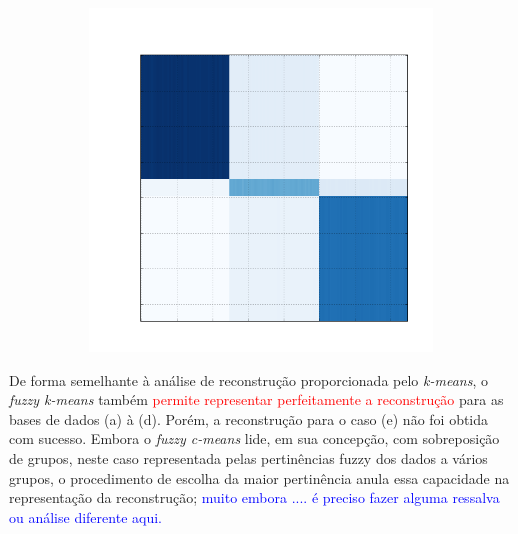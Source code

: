 \documentclass[
    12pt,                %
    oneside,            %
    a4paper,            %
    english,            %
    brazil                %
    ]{abntex2ppgsi}
\begin{document}
\begin{figure}[H]
\begin{subfigure}[b]{0.18\textwidth}
        \caption{}
    \end{subfigure}
    \begin{subfigure}[b]{0.18\textwidth}
        \includegraphics[width=\textwidth]{img/e-reconstruction-fkmeans.png}
        \caption{}
    \end{subfigure}
    \label{fig:reconstruction:fkmeans}
        \label{fig:reconstruction:kmeans}
\end{figure}



De forma semelhante à análise de reconstrução proporcionada pelo \textit{k-means}, o \textit{fuzzy k-means} também  \textcolor{red}{permite representar perfeitamente a reconstrução} para as bases de dados (a) à (d). Porém, a reconstrução para o caso (e) não foi obtida com sucesso. Embora o \textit{fuzzy c-means} lide, em sua concepção, com sobreposição de grupos, neste caso representada pelas pertinências fuzzy dos dados a vários grupos, o procedimento de escolha da maior pertinência anula essa capacidade na representação da reconstrução; \textcolor{blue}{muito embora .... é preciso fazer alguma ressalva ou análise diferente aqui.} 
\end{document}

